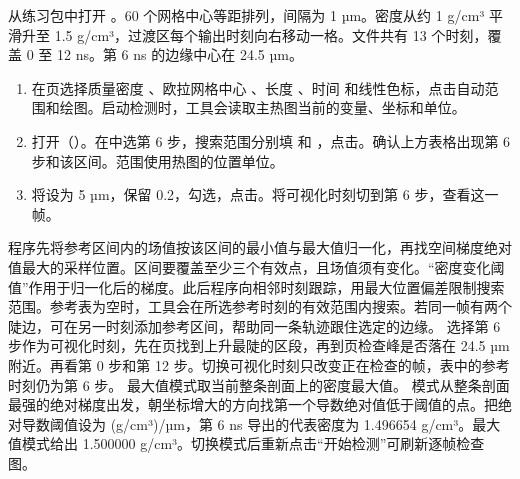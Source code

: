 从练习包中打开 。60 个网格中心等距排列，间隔为 1 µm。密度从约 1 g/cm³ 平滑升至 1.5 g/cm³，过渡区每个输出时刻向右移动一格。文件共有 13 个时刻，覆盖 0 至 12 ns。第 6 ns 的边缘中心在 24.5 µm。
\begin{enumerate}
\item 在页选择质量密度 、欧拉网格中心 、长度 、时间  和线性色标，点击自动范围和绘图。启动检测时，工具会读取主热图当前的变量、坐标和单位。
\item 打开（）。在中选第 6 步，搜索范围分别填  和 ，点击。确认上方表格出现第 6 步和该区间。范围使用热图的位置单位。
\item 将设为 5 µm，保留 0.2，勾选，点击。将可视化时刻切到第 6 步，查看这一帧。
\end{enumerate}

程序先将参考区间内的场值按该区间的最小值与最大值归一化，再找空间梯度绝对值最大的采样位置。区间要覆盖至少三个有效点，且场值须有变化。“密度变化阈值”作用于归一化后的梯度。此后程序向相邻时刻跟踪，用最大位置偏差限制搜索范围。参考表为空时，工具会在所选参考时刻的有效范围内搜索。若同一帧有两个陡边，可在另一时刻添加参考区间，帮助同一条轨迹跟住选定的边缘。
选择第 6 步作为可视化时刻，先在页找到上升最陡的区段，再到页检查峰是否落在 24.5 µm 附近。再看第 0 步和第 12 步。切换可视化时刻只改变正在检查的帧，表中的参考时刻仍为第 6 步。
最大值模式取当前整条剖面上的密度最大值。 模式从整条剖面最强的绝对梯度出发，朝坐标增大的方向找第一个导数绝对值低于阈值的点。把绝对导数阈值设为  (g/cm³)/µm，第 6 ns 导出的代表密度为 1.496654 g/cm³。最大值模式给出 1.500000 g/cm³。切换模式后重新点击“开始检测”可刷新逐帧检查图。

